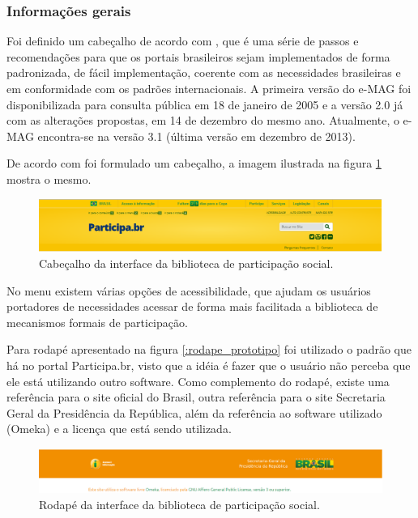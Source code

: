 \subsubsection{Informações gerais}

Foi definido um cabeçalho de acordo com \cite{emag2013usabilidade}, que é uma série de passos e recomendações para que os portais brasileiros sejam implementados de forma padronizada, de fácil implementação, coerente com as necessidades brasileiras e em conformidade com os padrões internacionais. A primeira versão do e-MAG foi disponibilizada para consulta pública em 18 de janeiro de 2005 e a versão 2.0 já com as alterações propostas, em 14 de dezembro do mesmo ano. Atualmente, o e-MAG encontra-se na versão 3.1 (última versão em dezembro de 2013). 

De acordo com \cite{emag2013usabilidade} foi formulado um cabeçalho, a imagem ilustrada na figura \ref{fig:cab_prototipo} mostra o mesmo.

\graphicspath{{figuras/prototipo/}}
\begin{figure}[H]
\centering
\includegraphics[width=1.0\textwidth]{cabecalho}
\caption{Cabeçalho da interface da biblioteca de participação social.}
\label{fig:cab_prototipo}
\end{figure}

No menu existem várias opções de acessibilidade, que ajudam os usuários portadores de necessidades acessar de forma mais facilitada a biblioteca de mecanismos formais de participação.

Para rodapé apresentado na figura \ref{:rodape_prototipo} foi utilizado o padrão que há no portal Participa.br, visto que a idéia é fazer que o usuário não perceba que ele está utilizando outro software. Como complemento do rodapé, existe uma referência para o site oficial do Brasil, outra referência para o site Secretaria Geral da Presidência da República, além da referência ao software utilizado (Omeka) e a licença que está sendo utilizada.

\graphicspath{{figuras/prototipo/}}
\begin{figure}[H]
\centering
\includegraphics[width=1.0\textwidth]{rodape}
\caption{Rodapé da interface da biblioteca de participação social.}
\label{fig:rodape_prototipo}
\end{figure}

